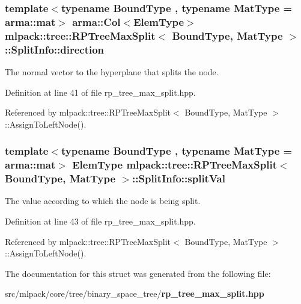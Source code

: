 \subsubsection[{direction}]{\setlength{\rightskip}{0pt plus 5cm}template$<$typename Bound\+Type , typename Mat\+Type  = arma\+::mat$>$ arma\+::\+Col$<${\bf Elem\+Type}$>$ {\bf mlpack\+::tree\+::\+R\+P\+Tree\+Max\+Split}$<$ Bound\+Type, Mat\+Type $>$\+::Split\+Info\+::direction}\label{structmlpack_1_1tree_1_1RPTreeMaxSplit_1_1SplitInfo_a64f2b66cf4022f77d60fd8a727cab309}


The normal vector to the hyperplane that splits the node. 



Definition at line 41 of file rp\+\_\+tree\+\_\+max\+\_\+split.\+hpp.



Referenced by mlpack\+::tree\+::\+R\+P\+Tree\+Max\+Split$<$ Bound\+Type, Mat\+Type $>$\+::\+Assign\+To\+Left\+Node().

\subsubsection[{split\+Val}]{\setlength{\rightskip}{0pt plus 5cm}template$<$typename Bound\+Type , typename Mat\+Type  = arma\+::mat$>$ {\bf Elem\+Type} {\bf mlpack\+::tree\+::\+R\+P\+Tree\+Max\+Split}$<$ Bound\+Type, Mat\+Type $>$\+::Split\+Info\+::split\+Val}\label{structmlpack_1_1tree_1_1RPTreeMaxSplit_1_1SplitInfo_aca60cf8641352ba284f72a17201e5f11}


The value according to which the node is being split. 



Definition at line 43 of file rp\+\_\+tree\+\_\+max\+\_\+split.\+hpp.



Referenced by mlpack\+::tree\+::\+R\+P\+Tree\+Max\+Split$<$ Bound\+Type, Mat\+Type $>$\+::\+Assign\+To\+Left\+Node().



The documentation for this struct was generated from the following file\+:\begin{DoxyCompactItemize}
\item 
src/mlpack/core/tree/binary\+\_\+space\+\_\+tree/{\bf rp\+\_\+tree\+\_\+max\+\_\+split.\+hpp}\end{DoxyCompactItemize}
